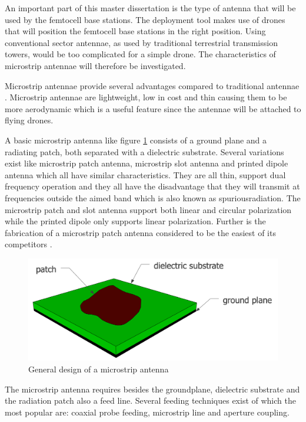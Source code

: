 An important part of this master dissertation is the type of antenna that will be used by the femtocell base stations. The deployment tool makes use
of drones that will position the femtocell base stations in the right position.  Using conventional 
sector antennae, as used by traditional terrestrial transmission towers, would be too complicated for a simple drone. 
The characteristics of microstrip antennae will therefore be investigated.

Microstrip antennae provide several advantages compared to traditional antennae \cite{J13_singh2011micro, J14_antennadesign}. Microstrip antennae
are lightweight, low in cost and thin causing them to be more aerodynamic which is a useful feature since the antennae will be attached
to flying drones.

A basic microstrip antenna like figure \ref{fig:basicpatchantenna} consists of a ground plane and
a radiating patch, both separated with a dielectric substrate. Several variations exist like microstrip patch antenna, microstrip slot antenna and printed dipole antenna which
all have similar characteristics. They are all thin, support dual frequency operation and they all have the disadvantage that they 
will transmit at frequencies outside the aimed band which is also known as
\gls{spuriousradiation}. The microstrip patch and slot antenna support both linear
and circular polarization while the printed dipole only supports linear polarization. Further is the fabrication of a microstrip patch antenna considered to be the easiest of its competitors \cite{J13_singh2011micro}. 

\begin{figure}[H]
\centering
  \includegraphics[width=\textwidth/2]{../images/patchantenna.png}
  \caption{General design of a microstrip antenna}
  \label{fig:basicpatchantenna}
\end{figure}

The microstrip antenna requires besides the groundplane, dielectric substrate and the radiation patch also a feed line. Several feeding techniques exist of which the most popular are: coaxial probe feeding, microstrip line and aperture coupling. %

